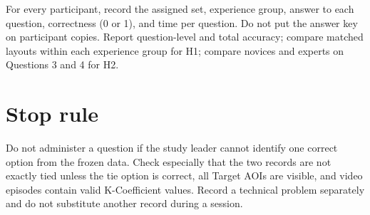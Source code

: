 \documentclass[11pt]{article}
\begin{document}
For every participant, record the assigned set, experience group, answer to
each question, correctness (0 or 1), and time per question. Do not put the
answer key on participant copies. Report question-level and total accuracy;
compare matched layouts within each experience group for H1; compare novices
and experts on Questions 3 and 4 for H2.

\section*{Stop rule}
Do not administer a question if the study leader cannot identify one correct
option from the frozen data. Check especially that the two records are not
exactly tied unless the tie option is correct, all Target AOIs are visible, and
video episodes contain valid K-Coefficient values. Record a technical problem
separately and do not substitute another record during a session.
\end{document}
